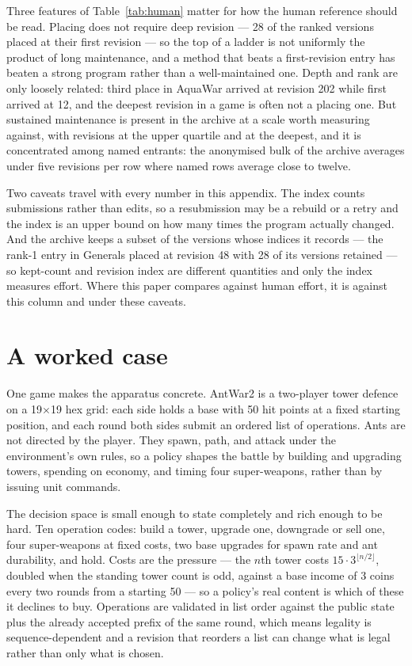 Three features of Table~\ref{tab:human} matter for how the human reference should be
read. Placing does not require deep revision --- 28 of the  ranked versions
placed at their first revision --- so the top of a ladder is not uniformly the product
of long maintenance, and a method that beats a first-revision entry has beaten a strong
program rather than a well-maintained one. Depth and rank are only loosely related:
third place in AquaWar arrived at revision 202 while first arrived at 12, and the
deepest revision in a game is often not a placing one. But sustained maintenance is
present in the archive at a scale worth measuring against, with 
revisions at the upper quartile and  at the deepest, and it is
concentrated among named entrants: the anonymised bulk of the archive averages under
five revisions per row where named rows average close to twelve.

Two caveats travel with every number in this appendix. The index counts submissions
rather than edits, so a resubmission may be a rebuild or a retry and the index is an
upper bound on how many times the program actually changed. And the archive keeps a
subset of the versions whose indices it records --- the rank-1 entry in Generals placed
at revision 48 with 28 of its versions retained --- so kept-count and revision index are
different quantities and only the index measures effort. Where this paper compares
 against human effort, it is against this column and under these caveats.

\section{A worked case}
\label{app:case}

One game makes the apparatus concrete. AntWar2 is a two-player tower defence on a
19$\times$19 hex grid: each side holds a base with 50 hit points at a fixed starting
position, and each round both sides submit an ordered list of operations. Ants are not
directed by the player. They spawn, path, and attack under the environment's own rules,
so a policy shapes the battle by building and upgrading towers, spending on economy, and
timing four super-weapons, rather than by issuing unit commands.

The decision space is small enough to state completely and rich enough to be hard. Ten
operation codes: build a tower, upgrade one, downgrade or sell one, four super-weapons
at fixed costs, two base upgrades for spawn rate and ant durability, and hold. Costs
are the pressure --- the $n$th tower costs $15 \cdot 3^{\lfloor n/2 \rfloor}$, doubled
when the standing tower count is odd, against a base income of 3 coins every two rounds
from a starting 50 --- so a policy's real content is which of these it declines to buy.
Operations are validated in list order against the public state plus the already
accepted prefix of the same round, which means legality is sequence-dependent and a
revision that reorders a list can change what is legal rather than only what is chosen.

